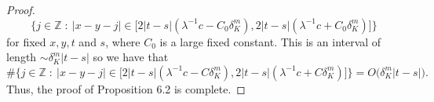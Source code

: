 \documentclass[10pt,a4paper]{amsart}
\newcommand{\Z}[1][]{\mathbb{Z}^#1}
\newcommand{\dK}[1]{\delta_{K}^{#1}}
\newcommand{\la}{\lambda}
\begin{document}
\begin{proof}
\begin{equation}
    \{ j \in \Z{} \ : \ |x- y - j|\in \big[2|t-s|(\la^{-1}c - C_0\dK{m}), 2|t-s|(\la^{-1}c + C_0\dK{m})\big] \}
\end{equation}  
for fixed $x,y,t$ and $s$, where $C_0$ is a large fixed constant. This is an interval of length $\sim \dK{m}|t-s|$ so we have that
\begin{equation}
    \#\{ j \in \Z{} \ : \ |x- y - j|\in \big[2|t-s|(\la^{-1}c - C\dK{m}), 2|t-s|(\la^{-1}c + C\dK{m})\big] \} = O\big(\dK{m}|t-s|\big).
\end{equation} Thus, the proof of Proposition 6.2 is complete.
\end{proof}
\end{document}
